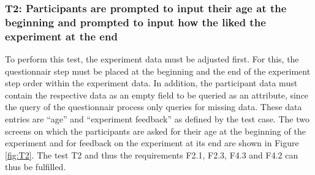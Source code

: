 \newpage

\subsubsection*{T2: Participants are prompted to input their age at the beginning and prompted to input how the liked the experiment at the end}

To perform this test, the experiment data must be adjusted first. For this, the questionnair step must be placed at the beginning and the end of the experiment step order within the experiment data. In addition, the participant data must contain the respective data as an empty field to be queried as an attribute, since the query of the questionnair process only queries for missing data. These data entries are \enquote{age} and \enquote{experiment feedback} as defined by the test case. The two screens on which the participants are asked for their age at the beginning of the experiment and for feedback on the experiment at its end are shown in Figure \ref{fig:T2}. The test T2 and thus the requirements F2.1, F2.3, F4.3 and F4.2 can thus be fulfilled.


